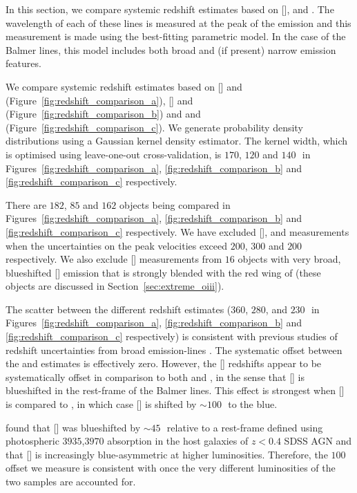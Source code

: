In this section, we compare systemic redshift estimates based on [], \hb and \hans. 
The wavelength of each of these lines is measured at the peak of the emission and this measurement is made using the best-fitting parametric model. 
In the case of the Balmer lines, this model includes both broad and (if present) narrow emission features. 

We compare systemic redshift estimates based on [] and \hb (Figure~\ref{fig:redshift_comparison_a}), [] and \ha (Figure~\ref{fig:redshift_comparison_b}) and \hb and \ha (Figure~\ref{fig:redshift_comparison_c}). 
We generate probability density distributions using a Gaussian kernel density estimator.
The kernel width, which is optimised using leave-one-out cross-validation, is $170$, $120$ and $140$\,\kms\, in Figures~\ref{fig:redshift_comparison_a}, \ref{fig:redshift_comparison_b} and \ref{fig:redshift_comparison_c} respectively. 

There are $182$, $85$ and $162$ objects being compared in Figures~\ref{fig:redshift_comparison_a}, \ref{fig:redshift_comparison_b} and \ref{fig:redshift_comparison_c} respectively. 
We have excluded [], \hb and \ha measurements when the uncertainties on the peak velocities exceed $200$, $300$ and $200$\,\kms\, respectively. 
We also exclude [] measurements from $16$ objects with very broad, blueshifted [] emission that is strongly blended with the red wing of \hb (these objects are discussed in Section~\ref{sec:extreme_oiii}).

The scatter between the different redshift estimates ($360$, $280$, and $230$\,\kms\, in Figures~\ref{fig:redshift_comparison_a}, \ref{fig:redshift_comparison_b} and \ref{fig:redshift_comparison_c} respectively) is consistent with previous studies of redshift uncertainties from broad emission-lines \citep[e.g.][]{shen16b}. 
The systematic offset between the \ha and \hb estimates is effectively zero. 
However, the [] redshifts appear to be systematically offset in comparison to both \ha and \hbns, in the sense that [] is blueshifted in the rest-frame of the Balmer lines. 
This effect is strongest when [] is compared to \hbns, in which case [] is shifted by $\sim100$\,\kms\, to the blue.

\citet{hewett10} found that [] was blueshifted by $\sim45$\,\kms\, relative to a rest-frame defined using photospheric \ll$3935$,$3970$ absorption in the host galaxies of $z<0.4$ SDSS AGN and that [] is increasingly blue-asymmetric at higher luminosities. 
Therefore, the $100$\,\kms offset we measure is consistent with \citet{hewett10} once the very different luminosities of the two samples are accounted for. 

